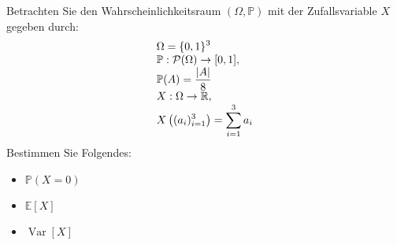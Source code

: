 \documentclass{article}
\begin{document}
\begin{problem}
Betrachten Sie den Wahrscheinlichkeitsraum $(\Omega, \mathbb{P})$ mit der Zufallsvariable $X$ gegeben durch:
\[
\begin{array}{>{\displaystyle}l}
\Omega = \{0, 1\}^3 \\
\mathbb{P}: \mathcal{P}(\Omega) \to [0, 1], \\
\mathbb{P}(A) = \frac{|A|}{8} \\
X: \Omega \to \mathbb{R}, \\
X \left( (a_i)_{i = 1}^3 \right) = \sum_{i = 1}^3 a_i
\end{array}
\]
Bestimmen Sie Folgendes:
\begin{itemize}
\item $\mathbb{P}(X = 0)$
\item $\mathbb{E}[X]$
\item $\operatorname{Var}[X]$
\end{itemize}
\end{problem}
\end{document}
